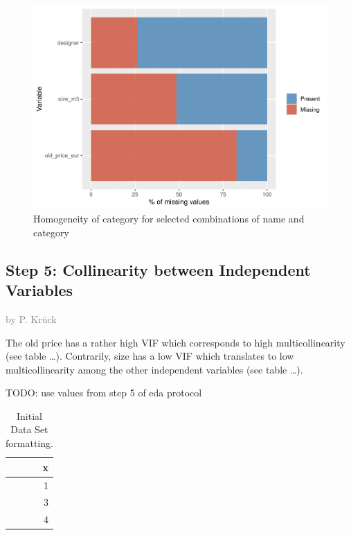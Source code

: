 \documentclass[a4paper, nobind]{templates/ociamthesis}
\begin{document}
\begin{figure}
\includegraphics[width=1\linewidth]{_main_files/figure-latex/missing-values-1} \caption{Homogeneity of category for selected combinations of name and category}\label{fig:missing-values}
\end{figure}

\hypertarget{step-5-collinearity-between-independent-variables}{%
\subsection{Step 5: Collinearity between Independent Variables}\label{step-5-collinearity-between-independent-variables}}

\textcolor{gray}{by P. Krück}

The old price has a rather high VIF which corresponds to high multicollinearity (see table \ldots{}). Contrarily, size has a low VIF which translates to low multicollinearity among the other independent variables (see table \ldots{}).

TODO: use values from step 5 of eda protocol

\begin{table}

\caption{\label{tab:initial-ikea2}Initial Data Set formatting.}
\centering
\begin{tabular}[t]{r}
\hline
x\\
\hline
1\\
\hline
3\\
\hline
4\\
\hline
\end{tabular}
\end{table}
\end{document}
